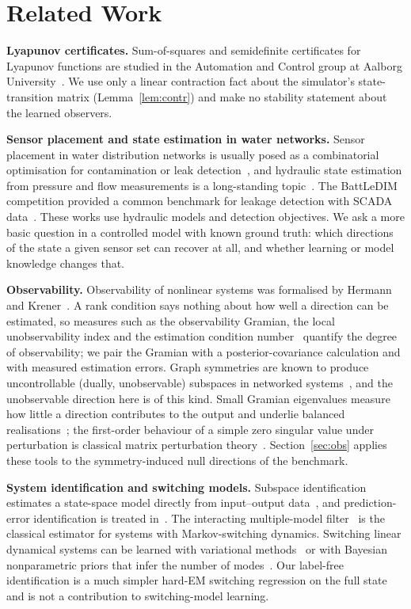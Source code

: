 \documentclass[conference]{IEEEtran}
\begin{document}
\section{Related Work}
\label{sec:related}

\textbf{Lyapunov certificates.} Sum-of-squares and semidefinite certificates for Lyapunov functions are studied in the Automation and Control group at Aalborg University~\cite{leth2017farkas,misra2020satellite}. We use only a linear contraction fact about the simulator's state-transition matrix (Lemma~\ref{lem:contr}) and make no stability statement about the learned observers.

\textbf{Sensor placement and state estimation in water networks.} Sensor placement in water distribution networks is usually posed as a combinatorial optimisation for contamination or leak detection~\cite{berry2005,krause2008}, and hydraulic state estimation from pressure and flow measurements is a long-standing topic~\cite{bargiela1989,preis2011}. The BattLeDIM competition provided a common benchmark for leakage detection with SCADA data~\cite{vrachimis2022}. These works use hydraulic models and detection objectives. We ask a more basic question in a controlled model with known ground truth: which directions of the state a given sensor set can recover at all, and whether learning or model knowledge changes that.

\textbf{Observability.} Observability of nonlinear systems was formalised by Hermann and Krener~\cite{hermann1977}. A rank condition says nothing about how well a direction can be estimated, so measures such as the observability Gramian, the local unobservability index and the estimation condition number~\cite{krener2009} quantify the degree of observability; we pair the Gramian with a posterior-covariance calculation and with measured estimation errors. Graph symmetries are known to produce uncontrollable (dually, unobservable) subspaces in networked systems~\cite{rahmani2009}, and the unobservable direction here is of this kind. Small Gramian eigenvalues measure how little a direction contributes to the output and underlie balanced realisations~\cite{moore1981}; the first-order behaviour of a simple zero singular value under perturbation is classical matrix perturbation theory~\cite{stewart1990}. Section~\ref{sec:obs} applies these tools to the symmetry-induced null directions of the benchmark.

\textbf{System identification and switching models.} Subspace identification estimates a state-space model directly from input--output data~\cite{vanoverschee1996}, and prediction-error identification is treated in~\cite{ljung1999}. The interacting multiple-model filter~\cite{blom1988,barshalom2001} is the classical estimator for systems with Markov-switching dynamics. Switching linear dynamical systems can be learned with variational methods~\cite{ghahramani2000} or with Bayesian nonparametric priors that infer the number of modes~\cite{fox2011}. Our label-free identification is a much simpler hard-EM switching regression on the full state and is not a contribution to switching-model learning.
\end{document}
